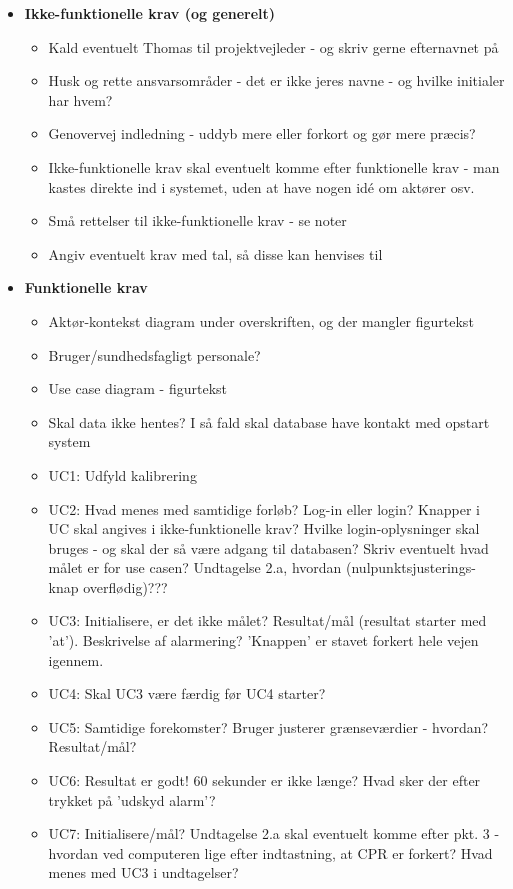 \documentclass[a4paper,11pt,oneside]{memoir}
\begin{document}
\begin{itemize}
\item \textbf{Ikke-funktionelle krav (og generelt)}
\begin{itemize}
\item Kald eventuelt Thomas til projektvejleder - og skriv gerne efternavnet på
\item Husk og rette ansvarsområder - det er ikke jeres navne - og hvilke initialer har hvem?
\item Genovervej indledning - uddyb mere eller forkort og gør mere præcis?
\item Ikke-funktionelle krav skal eventuelt komme efter funktionelle krav - man kastes direkte ind i systemet, uden at have nogen idé om aktører osv.
\item Små rettelser til ikke-funktionelle krav - se noter
\item Angiv eventuelt krav med tal, så disse kan henvises til
\end{itemize}
\item \textbf{Funktionelle krav}
\begin{itemize}
\item Aktør-kontekst diagram under overskriften, og der mangler figurtekst
\item Bruger/sundhedsfagligt personale?
\item Use case diagram - figurtekst
\item Skal data ikke hentes? I så fald skal database have kontakt med opstart system
\item UC1: Udfyld kalibrering
\item UC2: Hvad menes med samtidige forløb? Log-in eller login? Knapper i UC skal angives i ikke-funktionelle krav? Hvilke login-oplysninger skal bruges - og skal der så være adgang til databasen? Skriv eventuelt hvad målet er for use casen? Undtagelse 2.a, hvordan (nulpunktsjusterings-knap overflødig)???
\item UC3: Initialisere, er det ikke målet? Resultat/mål (resultat starter med 'at'). Beskrivelse af alarmering? 'Knappen' er stavet forkert hele vejen igennem.
\item UC4: Skal UC3 være færdig før UC4 starter?
\item UC5: Samtidige forekomster? Bruger justerer grænseværdier - hvordan? Resultat/mål?
\item UC6: Resultat er godt! 60 sekunder er ikke længe? Hvad sker der efter trykket på 'udskyd alarm'?
\item UC7: Initialisere/mål? Undtagelse 2.a skal eventuelt komme efter pkt. 3 - hvordan ved computeren lige efter indtastning, at CPR er forkert? Hvad menes med UC3 i undtagelser?

\end{itemize}
\end{itemize}
\end{document}
